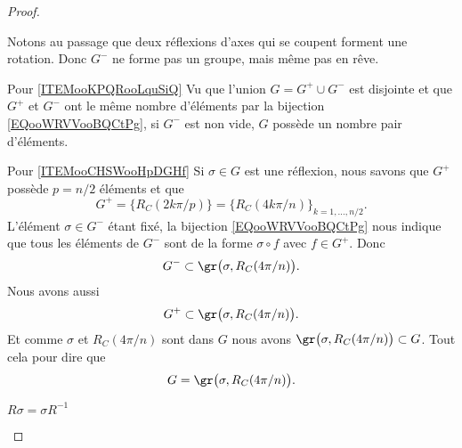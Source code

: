 \begin{proof}
\begin{subproof}
\begin{subproof}
                Notons au passage que deux réflexions d'axes qui se coupent forment une rotation. Donc \( G^-\) ne forme pas un groupe, mais même pas en rêve.
            \item[Pour \ref{ITEMooKPQRooLquSiQ}]
                Vu que l'union \( G=G^+\cup G^-\) est disjointe et que \( G^+\) et $G^-$ ont le même nombre d'éléments par la bijection \ref{EQooWRVVooBQCtPg}, si \( G^-\) est non vide, \( G\) possède un nombre pair d'éléments.
            \item[Pour \ref{ITEMooCHSWooHpDGHf}]
                Si \( \sigma\in G\) est une réflexion, nous savons que \( G^+\) possède \( p=n/2\) éléments et que
                \begin{equation}
                    G^+=\{  R_C(2k\pi/p)  \}=\{  R_C(4k\pi/n) \}_{k=1,\ldots, n/2}.
                \end{equation}
                L'élément \( \sigma\in G^- \) étant fixé, la bijection \eqref{EQooWRVVooBQCtPg} nous indique que tous les éléments de \( G^-\) sont de la forme \( \sigma\circ f\) avec \( f\in G^+\). Donc
                \begin{equation}
                    G^{-}\subset \gr\big( \sigma, R_C(4\pi/n)  \big).
                \end{equation}
                Nous avons aussi
                \begin{equation}
                    G^+\subset \gr\big( \sigma,  R_C(4\pi/n)  \big).
                \end{equation}
                Et comme \( \sigma\) et \(  R_C(4\pi/n)  \) sont dans \( G\) nous avons \( \gr\big( \sigma ,  R_C(4\pi/n)  \big)\subset G\). Tout cela pour dire que 
                \begin{equation}
                    G=\gr\big( \sigma,  R_C(4\pi/n) \big).
                \end{equation}

            \item[\( R\sigma = \sigma R^{-1}\)]


\end{subproof}
\end{subproof}
\end{proof}
